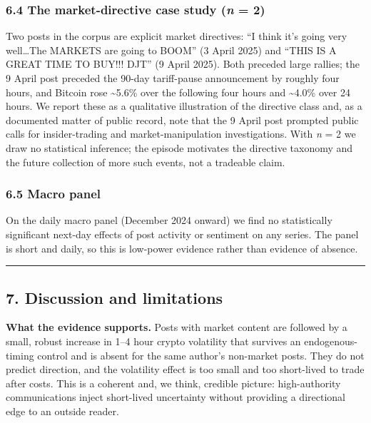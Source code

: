 \documentclass[
]{article}
\begin{document}
\subsubsection{\texorpdfstring{6.4 The market-directive case study
(\emph{n} =
2)}{6.4 The market-directive case study (n = 2)}}\label{the-market-directive-case-study-n-2}

Two posts in the corpus are explicit market directives: ``I think it's
going very well\ldots The MARKETS are going to BOOM'' (3 April 2025) and
``THIS IS A GREAT TIME TO BUY!!! DJT'' (9 April 2025). Both preceded
large rallies; the 9 April post preceded the 90-day tariff-pause
announcement by roughly four hours, and Bitcoin rose
\textasciitilde5.6\% over the following four hours and
\textasciitilde4.0\% over 24 hours. We report these as a qualitative
illustration of the directive class and, as a documented matter of
public record, note that the 9 April post prompted public calls for
insider-trading and market-manipulation investigations. With \emph{n} =
2 we draw no statistical inference; the episode motivates the directive
taxonomy and the future collection of more such events, not a tradeable
claim.

\subsubsection{6.5 Macro panel}\label{macro-panel}

On the daily macro panel (December 2024 onward) we find no statistically
significant next-day effects of post activity or sentiment on any
series. The panel is short and daily, so this is low-power evidence
rather than evidence of absence.

\begin{center}\rule{0.5\linewidth}{0.5pt}\end{center}

\subsection{7. Discussion and
limitations}\label{discussion-and-limitations}

\textbf{What the evidence supports.} Posts with market content are
followed by a small, robust increase in 1--4 hour crypto volatility that
survives an endogenous-timing control and is absent for the same
author's non-market posts. They do not predict direction, and the
volatility effect is too small and too short-lived to trade after costs.
This is a coherent and, we think, credible picture: high-authority
communications inject short-lived uncertainty without providing a
directional edge to an outside reader.
\end{document}
